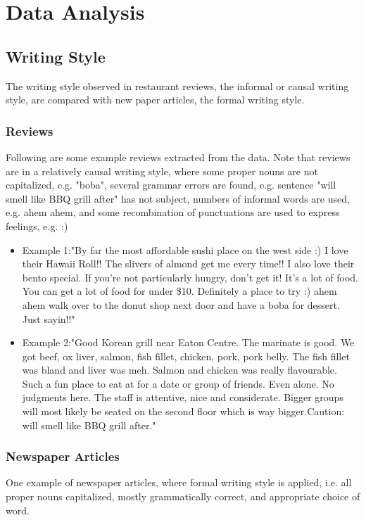 \documentclass[sigconf]{acmart}
\begin{document}
\section{Data Analysis}

\subsection{Writing Style}

The writing style observed in restaurant reviews, the informal or causal writing style, are compared with new paper articles, the formal writing style. 

\subsubsection{Reviews} Following are some example reviews extracted from the data. Note that reviews are in a relatively causal writing style, where some proper nouns are not capitalized, e.g. "boba", several grammar errors are found, e.g. sentence "will smell like BBQ grill after" has not subject, numbers of informal words are used, e.g. ahem ahem, and some recombination of punctuations are used to express feelings, e.g. :)

\begin{itemize}
\item{Example 1}:"By far the most affordable sushi place on the west side :) I love their Hawaii Roll!! The slivers of almond get me every time!! I also love their bento special. If you're not particularly hungry, don't get it! It's a lot of food.  You can get a lot of food for under \$10.  Definitely a place to try :) ahem ahem walk over to the donut shop next door and have a boba for dessert. Just sayin!!"
\item{Example 2}:"Good Korean grill near Eaton Centre. The marinate is good. We got beef, ox liver, salmon, fish fillet, chicken, pork, pork belly. The fish fillet was bland and liver was meh. Salmon and chicken was really flavourable. Such a fun place to eat at for a date or group of friends. Even alone. No judgments here. The staff is attentive, nice and considerate. Bigger groups will most likely be seated on the second floor which is way bigger.Caution: will smell like BBQ grill after."
\end{itemize}

\subsubsection{Newspaper Articles}
One example of newspaper articles, where formal writing style is applied, i.e. all proper nouns capitalized, mostly grammatically correct, and appropriate choice of word.
\end{document}
